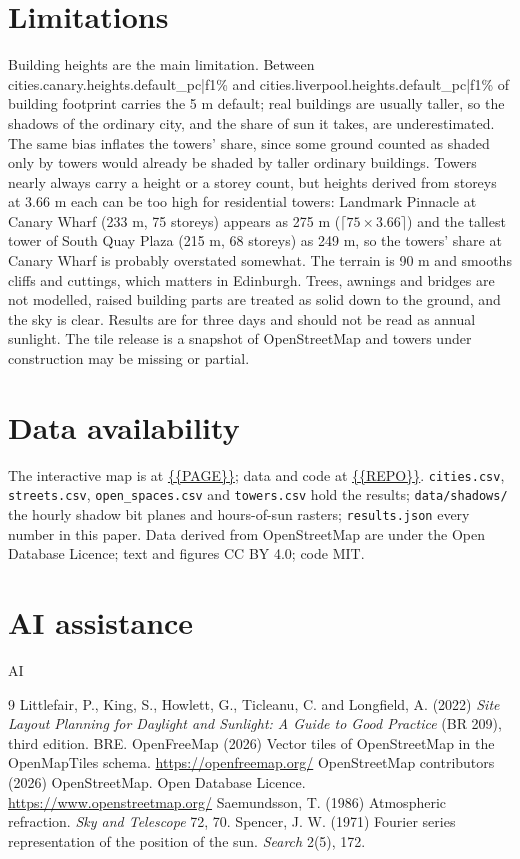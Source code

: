 \documentclass[11pt,a4paper]{article}
\begin{document}
\section{Limitations}
Building heights are the main limitation. Between {{cities.canary.heights.default_pc|f1}}\% and {{cities.liverpool.heights.default_pc|f1}}\% of building footprint carries the 5 m default; real buildings are usually taller, so the shadows of the ordinary city, and the share of sun it takes, are underestimated. The same bias inflates the towers' share, since some ground counted as shaded only by towers would already be shaded by taller ordinary buildings. Towers nearly always carry a height or a storey count, but heights derived from storeys at 3.66 m each can be too high for residential towers: Landmark Pinnacle at Canary Wharf (233 m, 75 storeys) appears as 275 m ($\lceil 75 \times 3.66 \rceil$) and the tallest tower of South Quay Plaza (215 m, 68 storeys) as 249 m, so the towers' share at Canary Wharf is probably overstated somewhat. The terrain is 90 m and smooths cliffs and cuttings, which matters in Edinburgh. Trees, awnings and bridges are not modelled, raised building parts are treated as solid down to the ground, and the sky is clear. Results are for three days and should not be read as annual sunlight. The tile release is a snapshot of OpenStreetMap and towers under construction may be missing or partial.

\section{Data availability}
The interactive map is at \url{{{PAGE}}}; data and code at \url{{{REPO}}}. \texttt{cities.csv}, \texttt{streets.csv}, \texttt{open\_spaces.csv} and \texttt{towers.csv} hold the results; \texttt{data/shadows/} the hourly shadow bit planes and hours-of-sun rasters; \texttt{results.json} every number in this paper. Data derived from OpenStreetMap are under the Open Database Licence; text and figures CC BY 4.0; code MIT.

\section*{AI assistance}
{{AI}}

\begin{thebibliography}{9}
 Littlefair, P., King, S., Howlett, G., Ticleanu, C. and Longfield, A. (2022) \textit{Site Layout Planning for Daylight and Sunlight: A Guide to Good Practice} (BR 209), third edition. BRE.
 OpenFreeMap (2026) Vector tiles of OpenStreetMap in the OpenMapTiles schema. \url{https://openfreemap.org/}
 OpenStreetMap contributors (2026) OpenStreetMap. Open Database Licence. \url{https://www.openstreetmap.org/}
 Saemundsson, T. (1986) Atmospheric refraction. \textit{Sky and Telescope} 72, 70.
 Spencer, J. W. (1971) Fourier series representation of the position of the sun. \textit{Search} 2(5), 172.
\end{thebibliography}
\end{document}
